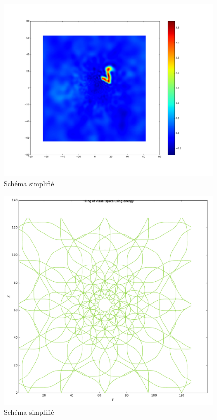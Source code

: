 \begin{figure}[th]
\centering
\includegraphics[scale=0.4]{Figures/mnist_128_LP}
\decoRule %
\caption[Figure]{Schéma simplifié}
\label{fig:mnist_128_LP}
\end{figure}

\begin{figure}[th]
\centering
\includegraphics[scale=0.4]{Figures/logpol_energy_filter}
\decoRule %
\caption[Figure]{Schéma simplifié}
\label{fig:energy_filter}
\end{figure}

